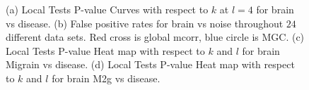 \documentclass[11pt]{article}
\begin{document}
\begin{figure}[htbp]
\centering
{}
\hfil
\centering
{}
\hfil
\centering
{}
\hfil
\centering
{}
\caption{
(a) Local Tests P-value Curves with respect to $k$ at $l=4$ for brain vs disease. 
(b) False positive rates for brain vs noise throughout $24$ different data sets. Red cross is global mcorr, blue circle is MGC.
(c) Local Tests P-value Heat map with respect to $k$ and $l$ for brain Migrain vs disease. 
(d) Local Tests P-value Heat map with respect to $k$ and $l$ for brain M2g vs disease. }
\label{figReal}
\end{figure}
\end{document}
